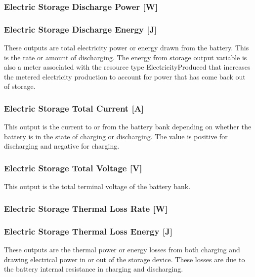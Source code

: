 \subsubsection{Electric Storage Discharge Power {[}W{]}}\label{electric-storage-discharge-power-w-1}

\subsubsection{Electric Storage Discharge Energy {[}J{]}}\label{electric-storage-discharge-energy-j-1}

These outputs are total electricity power or energy drawn from the battery. This is the rate or amount of discharging. The energy from storage output variable is also a meter associated with the resource type ElectricityProduced that increases the metered electricity production to account for power that has come back out of storage.

\subsubsection{Electric Storage Total Current {[}A{]}}\label{electric-storage-total-current-a}

This output is the current to or from the battery bank depending on whether the battery is in the state of charging or discharging. The value is positive for discharging and negative for charging.

\subsubsection{Electric Storage Total Voltage {[}V{]}}\label{electric-storage-total-voltage-v}

This output is the total terminal voltage of the battery bank.

\subsubsection{Electric Storage Thermal Loss Rate {[}W{]}}\label{electric-storage-thermal-loss-rate-w-1}

\subsubsection{Electric Storage Thermal Loss Energy {[}J{]}}\label{electric-storage-thermal-loss-energy-j-1}

These outputs are the thermal power or energy losses from both charging and drawing electrical power in or out of the storage device. These losses are due to the battery internal resistance in charging and discharging.

